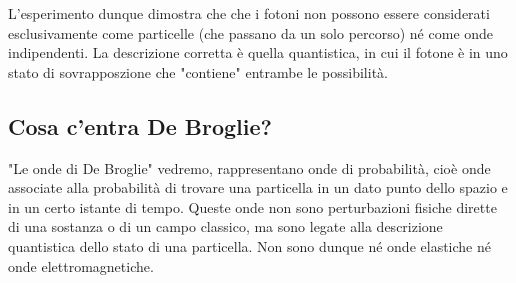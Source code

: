 	L'esperimento dunque dimostra che che i fotoni non possono essere considerati esclusivamente come particelle (che passano da un solo percorso) né come onde indipendenti. La descrizione corretta è quella quantistica, in cui il fotone è in uno stato di sovrapposzione che "contiene" entrambe le possibilità.

\subsection{Cosa c'entra De Broglie?}

	"Le onde di De Broglie" vedremo, rappresentano onde di probabilità, cioè onde associate alla probabilità di trovare una particella in un dato punto dello spazio e in un certo istante di tempo. Queste onde non sono perturbazioni fisiche dirette di una sostanza o di un campo classico, ma sono legate alla descrizione quantistica dello stato di una particella. Non sono dunque né onde elastiche né onde elettromagnetiche.








